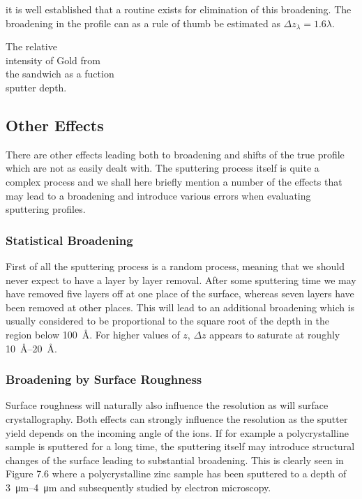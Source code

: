 it is well established that a routine exists for elimination of this broadening. The broadening in the profile can as a rule of thumb be estimated as $\Delta z_{\lambda}= 1.6 \lambda$.

 \vspace{1cm}

  The relative\\ intensity of Gold
 from\\ the sandwich as a fuction\\ sputter depth.\\

 \vspace{8cm}

\subsection{Other Effects}
There are other effects leading both to broadening and shifts of the true profile which are not as easily dealt with. The sputtering process itself is quite a complex process and we shall here briefly mention a number of the effects that may lead to a broadening and introduce various errors when evaluating sputtering profiles.

\subsubsection{Statistical Broadening}
First of all the sputtering process is a random process, meaning that we should never expect to have a layer by layer removal. After some sputtering time we may have removed five layers off at one place of the surface, whereas seven layers have been removed at other places. This will lead to an additional broadening which is usually considered to be proportional to the square root of the depth in the region below \SI{100}{\angstrom}. For higher values of $z$, $\Delta z$ appears to saturate at roughly \SIrange{10}{20}{\angstrom}.

\subsubsection{Broadening by Surface Roughness}
Surface roughness will naturally also influence the resolution as will surface crystallography. Both effects can strongly influence the resolution as the sputter yield depends on the incoming angle of the ions. If for example a polycrystalline sample is sputtered for a long time, the sputtering itself may introduce structural changes of the surface leading to substantial broadening. This is clearly seen in Figure 7.6 where a polycrystalline zinc sample has been sputtered to a depth of \SIrange{3}{4}{\micro m} and subsequently studied by electron microscopy.


